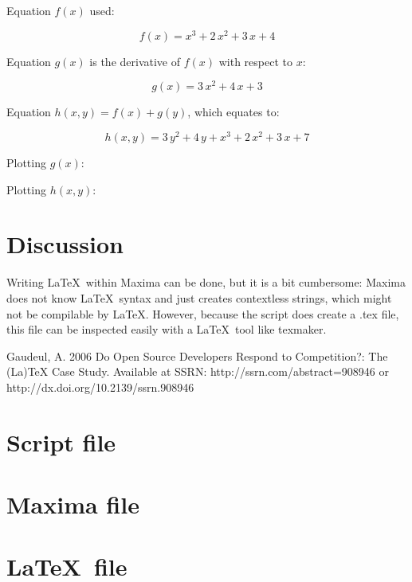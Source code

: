 \documentclass{article}
\begin{document}
Equation $f(x)$ used:

$$f\left(x\right)=x^3+2\,x^2+3\,x+4$$

Equation $g(x)$ is the derivative of $f(x)$ with respect to $x$:

$$g\left(x\right)=3\,x^2+4\,x+3$$

Equation $h(x,y) = f(x) + g(y)$, which equates to:

$$h\left(x , y\right)=3\,y^2+4\,y+x^3+2\,x^2+3\,x+7$$

Plotting $g(x)$:

Plotting $h(x,y)$:


\section{Discussion}

Writing \LaTeX~within Maxima can be done, but it is a bit cumbersome:
Maxima does not know \LaTeX~syntax and just creates contextless strings,
which might not be compilable by \LaTeX.
However, because the script does create a .tex file,
this file can be inspected easily with a \LaTeX~tool like texmaker.

\begin{thebibliography}{9}

  Gaudeul, A.
  2006
  Do Open Source Developers Respond to Competition?: The (La)TeX Case Study.
  Available at SSRN: http://ssrn.com/abstract=908946 or http://dx.doi.org/10.2139/ssrn.908946
\end{thebibliography}

\appendix

\section{Script file}



\section{Maxima file}



\section{\LaTeX~file}


\end{document}

